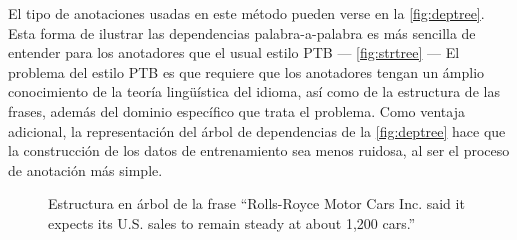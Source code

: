 El tipo de anotaciones usadas en este método pueden verse en la
\autoref{fig:deptree}. Esta forma de ilustrar las dependencias palabra-a-palabra
es más sencilla de entender para los anotadores que el usual estilo \ac{PTB} ---
\autoref{fig:strtree} --- El problema del estilo \ac{PTB} es que requiere que
los anotadores tengan un ámplio conocimiento de la teoría lingüística del
idioma, así como de la estructura de las frases, además del dominio específico
que trata el problema. Como ventaja adicional, la representación del árbol de
dependencias de la \autoref{fig:deptree} hace que la construcción de los datos
de entrenamiento sea menos ruidosa, al ser el proceso de anotación más simple.
\begin{figure}[ht]
\tiny
{}
\caption{Estructura en árbol de la frase ``Rolls-Royce Motor Cars Inc. said it
  expects its U.S. sales to remain steady at about 1,200 cars.''}
\label{fig:strtree}
\end{figure}
